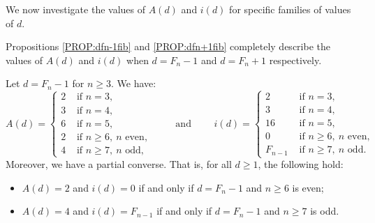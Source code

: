 \documentclass[10pt,a4paper,reqno]{amsart}
\begin{document}
We now investigate the values of $A(d)$ and $i(d)$ for specific families of values of $d$.

Propositions \ref{PROP:dfn-1fib} and \ref{PROP:dfn+1fib} completely describe the values of $A(d)$ and $i(d)$ when $d=F_n-1$ and $d=F_n+1$ respectively.
\begin{prop}\label{PROP:dfn-1fib}
Let $d=F_n-1$ for $n\geq 3$. We have:
\[
A(d) =
\begin{cases}
2 &\text{ if } n=3,\\
3 &\text{ if } n=4,\\
6 &\text{ if } n=5,\\
2 &\text{ if } n \geq 6, \ n\text{ even}, \\
4 &\text{ if } n \geq 7, \ n\text{ odd}, 
\end{cases}
\qquad \text{ and } \qquad
i(d) =
\begin{cases}
2 &\text{ if } n=3,\\
3 &\text{ if } n=4,\\
16 &\text{ if } n=5,\\
0 &\text{ if } n \geq 6, \ n\text{ even},\\
F_{n-1} &\text{ if } n \geq 7, \ n\text{ odd}.
\end{cases}
\]
Moreover, we have a partial converse. That is, for all $d \geq 1$, the following hold:
\begin{itemize}
\item $A(d) = 2$ and $i(d)=0$ if and only if $d=F_n-1$ and $n\geq 6$ is even;
\item $A(d) = 4$ and $i(d)=F_{n-1}$ if and only if $d = F_n-1$ and $n\geq 7$ is odd.

\end{itemize}
\end{prop}
\end{document}
